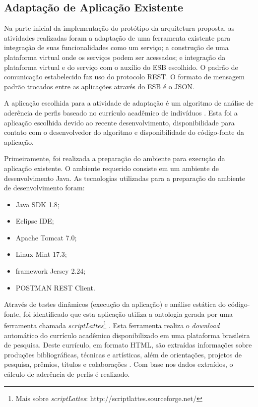 \subsection{Adaptação de Aplicação Existente}
Na parte inicial da implementação do protótipo da arquitetura proposta, as atividades realizadas foram a adaptação de uma ferramenta existente para integração de suas funcionalidades como um serviço; a construção de uma plataforma virtual onde os serviços podem ser acessados; e integração da plataforma virtual e do serviço com o auxílio do ESB escolhido. O padrão de comunicação estabelecido faz uso do protocolo REST. O formato de mensagem padrão trocados entre as aplicações através do ESB é o JSON.

A aplicação escolhida para a atividade de adaptação é um algoritmo de análise de aderência de perfis baseado no currículo acadêmico de indivíduos \cite{jesus_algoritmo_2014}. Esta foi a aplicação escolhida devido ao recente desenvolvimento, disponibilidade para contato com o desenvolvedor do algoritmo e disponibilidade do código-fonte da aplicação.

Primeiramente, foi realizada a preparação do ambiente para execução da aplicação existente. O ambiente requerido consiste em um ambiente de desenvolvimento Java. As tecnologias utilizadas para a preparação do ambiente de desenvolvimento foram:
\begin{itemize}
\item Java SDK 1.8;
\item Eclipse IDE;
\item Apache Tomcat 7.0;
\item Linux Mint 17.3;
\item framework Jersey 2.24;
\item POSTMAN REST Client.
\end{itemize}

Através de testes dinâmicos (execução da aplicação) e análise estática do código-fonte, foi identificado que esta aplicação utiliza a ontologia gerada por uma ferramenta chamada \textit{scriptLattes}\footnote{Mais sobre \textit{scriptLattes}: http://scriptlattes.sourceforge.net/} . Esta ferramenta realiza o \textit{download} automático do currículo acadêmico disponibilizado em uma plataforma brasileira de pesquisa. Deste currículo, em formato HTML, são extraídas informações sobre produções bibliográficas, técnicas e artísticas, além de orientações, projetos de pesquisa, prêmios, títulos e colaborações \cite{scriptlattes_2009}. Com base nos dados extraídos, o cálculo de aderência de perfis é realizado.


